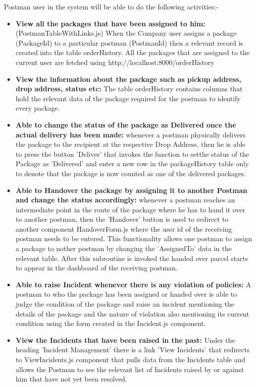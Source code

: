 Postman user in the system will be able to do the following activities:-
\begin{itemize}
\item {\textbf{View all the packages that have been assigned to him: }}(PostmanTableWithLinks.js) When the Company user assigns a package (PackageId) to a particular postman (PostmanId) then a relevant record is created into the table orderHistory. All the packages that are assigned to the current user are fetched using http://localhost:8000/orderHistory

\item \textbf{View the information about the package such as pickup address, drop address, status etc:} The table orderHistory contains columns that hold the relevant data of the package required for the postman to identify every package.
\item \textbf{Able to change the status of the package as Delivered once the actual delivery has been made:} whenever a postman physically delivers the package to the recipient at the respective Drop Address, then he is able to press the button 'Deliver' that invokes the function to setthe status of the Package as 'Delivered' and enter a new row in the packageHistory table only to denote that the package is now counted as one of the delivered packages.
\item \textbf{Able to Handover the package by assigning it to another Postman and change the status accordingly: }whenever a postman reaches an intermediate point in the route of the package where he has to hand it over to another postman, then the 'Handover' button is used to redirect to another component HandoverForm.js where the user id of the receiving postman needs to be entered. This functionality allows one postman to assign a package to nother postman by changing the 'AssignedTo' data in the relevant table. After this subroutine is invoked the handed over parcel  starts to appear in the dashboard of the receiving postman.
\item \textbf{Able to raise Incident whenever there is any violation of policies:} A postman to who the package has been assigned or handed over is able to judge the condition of the package and raise an incident mentioning the details of the package and the nature of violation also mentioning its current condition using the form created in the Incident.js component.
\item \textbf{View the Incidents that have been raised in the past: }Under the heading 'Incident Management' there is a link 'View Incidents' that redirects to ViewIncidents.js component that pulls data from the Incidents table and allows the Postman to see the relevant list of Incidents raised by or against him that have not yet been resolved.
\end{itemize}

